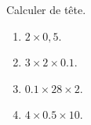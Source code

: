 \begin{exercice*}
   Calculer de tête.
   \begin{multicols}{2}
      \begin{enumerate}
         \item $2\times0,5$.
         \item $3\times2\times\num{0.1}$.
         \item $\num{0.1}\times28\times2$.
         \item $4\times\num{0.5}\times10$.
      \end{enumerate}
   \end{multicols}
\end{exercice*}
